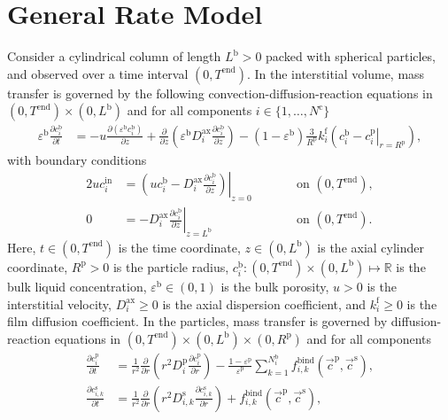 \documentclass{article}
\begin{document}
\section*{General Rate Model}
Consider a cylindrical column of length $L^{\mathrm{b}} > 0$ packed with spherical particles, and observed over a time interval $(0, T^{\mathrm{end}})$.
In the interstitial volume, mass transfer is governed by the following convection-diffusion-reaction equations in $(0, T^{\mathrm{end}})\times (0, L^{\mathrm{b}})$ and for all components $i\in\{1, \dots, N^{\mathrm{c}} \}$
\begin{align}
    \varepsilon^{\mathrm{b}} \frac{\partial c^{\mathrm{b}}_{i}}{\partial t}
    &= - u \frac{\partial \left( \varepsilon^{\mathrm{b}} c^{\mathrm{b}}_{i} \right)}{\partial z}
        + \frac{\partial}{\partial z} \left( \varepsilon^{\mathrm{b}} D^{\mathrm{ax}}_{i} \frac{\partial c^{\mathrm{b}}_{i}}{\partial z} \right)
        - \left(1 - \varepsilon^{\mathrm{b}} \right) \frac{3}{R^{\mathrm{p}}} k^{\mathrm{f}}_{i} \left(c^{\mathrm{b}}_{i} - \left. c^{\mathrm{p}}_{i} \right|_{r = R^{\mathrm{p}}} \right),
\end{align}
with boundary conditions
\begin{alignat}{2}
    u c^{\mathrm{in}}_{i}
    &= \left.\left( u c^{\mathrm{b}}_{i} - D^{\mathrm{ax}}_{i} \frac{\partial c^{\mathrm{b}}_{i}}{\partial z}\right)\right|_{z=0}
    & & \qquad\text{on }(0, T^{\mathrm{end}}),
    \\
    0
    &= - D^{\mathrm{ax}}_{i} \left. \frac{\partial c^{\mathrm{b}}_{i}}{\partial z} \right|_{z=L^{\mathrm{b}}}
    & & \qquad\text{on }(0, T^{\mathrm{end}}).
\end{alignat}
Here, $t\in (0, T^{\mathrm{end}})$ is the time coordinate, $z\in (0, L^{\mathrm{b}})$ is the axial cylinder coordinate, $R^{\mathrm{p}}> 0$ is the particle radius, $c^{\mathrm{b}}_{i}\colon (0, T^{\mathrm{end}})\times (0, L^{\mathrm{b}}) \mapsto \mathbb{R}$ is the bulk liquid concentration, $\varepsilon^{\mathrm{b}}\in (0, 1)$ is the bulk porosity, $u> 0$ is the interstitial velocity, $D^{\mathrm{ax}}_{i}\geq 0$ is the axial dispersion coefficient, and $k^{\mathrm{f}}_{i}\geq 0$ is the film diffusion coefficient.
In the particles, mass transfer is governed by diffusion-reaction equations in $(0, T^{\mathrm{end}}) \times (0, L^{\mathrm{b}})\times (0, R^{\mathrm{p}})$ and for all components
\begin{align}
    \frac{\partial c^{\mathrm{p}}_{i}}{\partial t}
    &= \frac{1}{r^{2}} \frac{\partial }{\partial r} \left( r^{2} D^{\mathrm{p}}_{i} \frac{\partial c^{\mathrm{p}}_{i}}{\partial r} \right)
        - \frac{1 - \varepsilon^{\mathrm{p}}}{\varepsilon^{\mathrm{p}}}\sum_{k=1}^{N^{\mathrm{b}}_{i}} f^{\mathrm{bind}}_{i,k}\left( \vec{c}^{\mathrm{p}}, \vec{c}^{\mathrm{s}} \right),
    \\
    \frac{\partial c^{\mathrm{s}}_{i,k}}{\partial t}
    &= \frac{1}{r^{2}} \frac{\partial }{\partial r} \left( r^{2} D^{\mathrm{s}}_{i,k} \frac{\partial c^{\mathrm{s}}_{i,k}}{\partial r} \right)
        + f^{\mathrm{bind}}_{i,k}\left( \vec{c}^{\mathrm{p}}, \vec{c}^{\mathrm{s}} \right),
\end{align}
\end{document}

